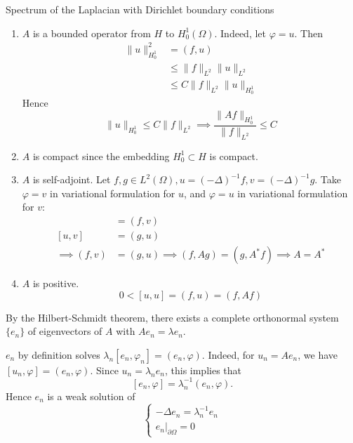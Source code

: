 \documentclass{report}
\begin{document}
\begin{example}{Spectrum of the Laplacian with Dirichlet boundary conditions}{}
    \begin{enumerate}
        \item \(A\) is a bounded operator from \(H\) to \(H^{1}_{0}(\Omega)\). Indeed, let \(\varphi = u\). Then
        \begin{align*}
            \|u\|_{H^{1}_{0}}^{2} &= (f, u) \\
            &\leq \|f\|_{L^{2}}\|u\|_{L^{2}} \\
            &\leq C\|f\|_{L^{2}}\|u\|_{H^{1}_{0}}
        \end{align*}
        Hence 
        \[
            \|u\|_{H^{1}_{0}} \leq C \|f\|_{L^{2}} \implies \frac{\|Af\|_{H^{1}_{0}}}{\|f\|_{L^{2}}} \leq C
        \]
        \item \(A\) is compact since the embedding \(H^{1}_{0} \subset H\) is compact.
        \item \(A\) is self-adjoint. Let \(f, g \in L^{2}(\Omega), u = (- \Delta)^{-1}f, v = (- \Delta)^{-1}g\). Take \(\varphi = v\) in variational formulation for \(u\), and \(\varphi = u\) in variational formulation for \(v\):
        \begin{align*}
            [u, v] &= (f, v) \\
            [u, v] &= (g, u) \\
            \implies (f, v) &= (g, u) \implies (f, Ag) = (g, A^{*}f) \implies A = A^{*}
        \end{align*}
        \item \(A\) is positive.
        \[
            0 < [u, u] = (f, u) = (f, Af)
        \]    
    \end{enumerate}
    By the Hilbert-Schmidt theorem, there exists a complete orthonormal system \(\{e_{n}\}\) of eigenvectors of \(A\) with \(Ae_{n} = \lambda e_{n}\). 
        
    \(e_{n}\) by definition solves \(\lambda_{n}[e_{n}, \varphi_{n}] = (e_{n}, \varphi)\). Indeed, for \(u_{n} = Ae_{n}\), we have \([u_{n}, \varphi] = (e_{n}, \varphi)\). Since \(u_{n} = \lambda_{n}e_{n}\), this implies that 
    \begin{equation}\label{eq:3.15}
        [e_{n}, \varphi] = \lambda_{n}^{-1}(e_{n}, \varphi).
    \end{equation}
    Hence \(e_{n}\) is a weak solution of
    \begin{equation*}
        \begin{cases}
            - \Delta e_{n} = \lambda_{n}^{-1}e_{n} \\
            \left. e_{n} \right|_{\partial \Omega} = 0
        \end{cases}
    \end{equation*}
\end{example}
\end{document}
